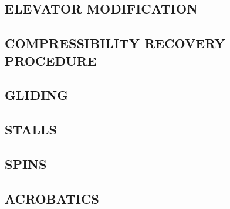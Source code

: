 \subsection{ELEVATOR MODIFICATION}
\subsection{COMPRESSIBILITY RECOVERY PROCEDURE}
\subsection{GLIDING}
\subsection{STALLS}
\subsection{SPINS}
\subsection{ACROBATICS}


\cleardoublepage{}